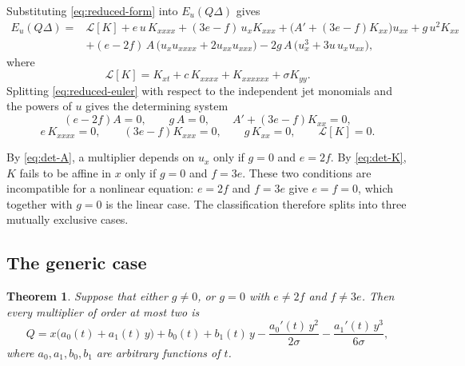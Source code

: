 \documentclass[11pt]{article}
\numberwithin{equation}{section}
\newtheorem{theorem}{Theorem}[section]
\theoremstyle{definition}
\theoremstyle{remark}
\begin{document}
Substituting \eqref{eq:reduced-form} into $E_u(Q\Delta)$ gives
\begin{equation}
\begin{aligned}
E_u(Q\Delta)
={}& \mathcal{L}[K]
+ e\,u\,K_{xxxx}
+ (3e-f)\,u_x K_{xxx}
+ \bigl(A' + (3e-f)K_{xx}\bigr) u_{xx}
+ g\,u^2 K_{xx}
\\
&+ (e-2f)\,A\,\bigl(u_x u_{xxxx} + 2u_{xx}u_{xxx}\bigr)
- 2g\,A\,\bigl(u_x^3 + 3u\,u_x u_{xx}\bigr),
\end{aligned}
\label{eq:reduced-euler}
\end{equation}
where
\begin{equation}
\mathcal{L}[K]
= K_{xt} + c\,K_{xxxx} + K_{xxxxxx} + \sigma K_{yy}.
\label{eq:L-operator}
\end{equation}
Splitting \eqref{eq:reduced-euler} with respect to the independent
jet monomials and the powers of $u$ gives the determining system
\begin{equation}
(e-2f)A = 0,
\qquad
g\,A = 0,
\qquad
A' + (3e-f)K_{xx} = 0,
\label{eq:det-A}
\end{equation}
\begin{equation}
e\,K_{xxxx} = 0,
\qquad
(3e-f)K_{xxx} = 0,
\qquad
g\,K_{xx} = 0,
\qquad
\mathcal{L}[K] = 0 .
\label{eq:det-K}
\end{equation}

By \eqref{eq:det-A}, a multiplier depends on $u_x$ only if $g=0$ and
$e=2f$. By \eqref{eq:det-K}, $K$ fails to be affine in $x$ only if
$g=0$ and $f=3e$. These two conditions are incompatible for a
nonlinear equation: $e=2f$ and $f=3e$ give $e=f=0$, which together
with $g=0$ is the linear case. The classification therefore splits
into three mutually exclusive cases.

\subsection{The generic case}

\begin{theorem}
\label{thm:generic}
Suppose that either $g\neq0$, or $g=0$ with $e\neq2f$ and $f\neq3e$.
Then every multiplier of order at most two is
\begin{equation}
Q = x\bigl(a_0(t) + a_1(t)\,y\bigr)
+ b_0(t) + b_1(t)\,y
- \frac{a_0'(t)\,y^2}{2\sigma}
- \frac{a_1'(t)\,y^3}{6\sigma},
\label{eq:generic-multiplier}
\end{equation}
where $a_0,a_1,b_0,b_1$ are arbitrary functions of $t$.
\end{theorem}
\end{document}
